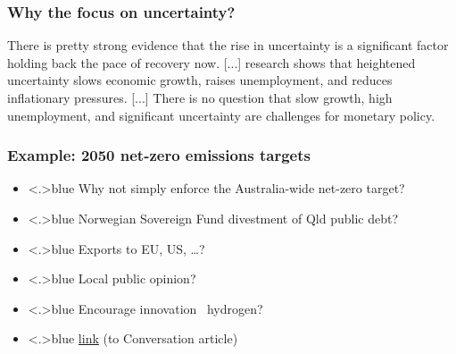 \documentclass[handout,english]{beamer}
\begin{document}
\begin{frame}
\frametitle{Why the focus on uncertainty?}

There is pretty strong evidence that the rise in uncertainty is a significant factor holding back the pace of recovery now. [...] research shows that heightened uncertainty slows economic growth, raises unemployment, and reduces inflationary pressures. [...] There is no question that slow growth, high unemployment, and significant uncertainty are challenges for monetary policy.
\end{frame}

\begin{frame}
\frametitle{{\color{patrickcolor3}
  Example: 2050 net-zero emissions targets
}
}
\begin{itemize}
\item<+-|alert@+>{\color<.>{blue}
        Why not simply enforce the Australia-wide net-zero target?
        }
\end{itemize}

\begin{itemize}
\item<+-|alert@+>{\color<.>{blue}
        Norwegian Sovereign Fund divestment of Qld public debt?
        }
\item<+-|alert@+>{\color<.>{blue}
        Exports to EU, US, \dots?
        }
  \item<+-|alert@+>{\color<.>{blue}
        Local public opinion?
        }
  \item<+-|alert@+>{\color<.>{blue}
        Encourage innovation \eg\ hydrogen?
        }
\end{itemize}
\begin{itemize}

  \item<+-|alert@+>{\color<.>{blue} {\color{magenta}\href{https://theconversation.com/economists-back-carbon-price-say-benefits-of-net-zero-outweigh-costs-169939}{link}} (to Conversation article)
        }

\end{itemize}
\vfill\end{frame}
\end{document}
